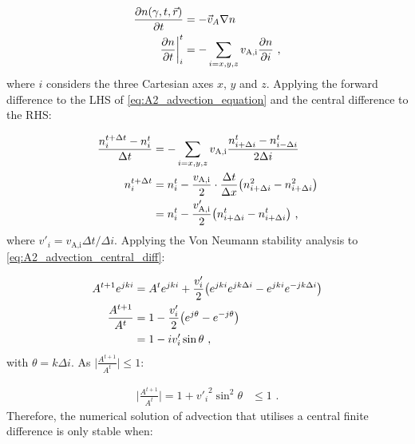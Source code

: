 \begin{equation}
    \begin{aligned}
    \pdv{n\qty(\gamma,t,\vec{r})}{t}&=-\vec{v}_A\nabla n  \\
    \pdv{n}{t}\bigg|_{i}^t&=-\sum_{i=x,y,z}v_\text{A,i}\pdv{n}{i}\text{ ,} 
    \end{aligned} \label{eq:A2_advection_equation}
\end{equation}
\noindent where $i$ considers the three Cartesian axes $x$, $y$ and $z$. Applying the forward difference to the LHS of \autoref{eq:A2_advection_equation} and the central difference to the RHS:

\begin{equation}
    \begin{aligned}
    \frac{n^{t+\Delta t}_i-n^t_i}{\Delta t}&=-\sum_{i=x,y,z} v_\text{A,i}\frac{n_{i+\Delta i}^t-n_{i-\Delta i}^t}{2\Delta i} \\
    n_i^{t+\Delta t}&=n_i^t-\frac{v_\text{A,i}}{2}\cdot\frac{\Delta t}{\Delta x}\qty(n_{i+\Delta i}^2-n_{i+\Delta i}^2) \\
    &=n_i^t-\frac{v_\text{A,i}'}{2}\qty(n_{i+\Delta i}^t-n_{i+\Delta i}^t)\text{ ,} 
    \end{aligned} \label{eq:A2_advection_central_diff}
\end{equation}
\noindent where $v'_i=v_\text{A,i}{\Delta t}/{\Delta i}$. Applying the Von Neumann stability analysis to \autoref{eq:A2_advection_central_diff}:

\begin{equation}
    \begin{aligned}
    A^{t+1}e^{jki}&=A^te^{jki}+\frac{v'_i}{2}\qty(e^{jki}e^{jk\Delta i}-e^{jki}e^{-jk\Delta i}) \\
    \frac{A^{t+1}}{A^t}&=1-\frac{v'_i}{2}\qty(e^{j\theta}-e^{-j\theta}) \\
    &=1-iv'_i\sin\theta\text{ ,} 
    \end{aligned}
\end{equation}
\noindent with $\theta=k\Delta i$. As $\lvert \frac{A^{t+1}}{A^t}\rvert\leq 1$:

\begin{equation}
    \begin{aligned}
        \bigg| \frac{A^{t+1}}{A^t}\bigg|=1+{v'_i}^2\sin^2\theta &\leq1\text{ .} 
    \end{aligned}
\end{equation}
\noindent Therefore, the numerical solution of advection that utilises a central finite difference is only stable when:

